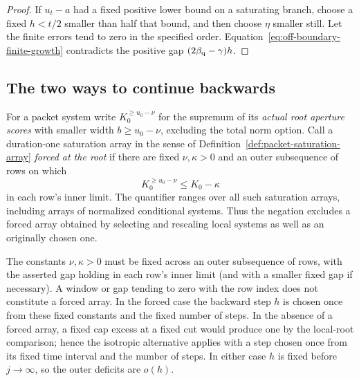\begin{proof}
If \(u_t-a\) had a fixed positive lower bound on a saturating branch,
choose a fixed \(h<t/2\) smaller than half that bound, and then choose
\(\eta\) smaller still.  Let the finite errors tend to zero in the
specified order.  Equation~\eqref{eq:off-boundary-finite-growth}
contradicts the positive gap \((2\beta_{\mathrm q}-\gamma)h\).
\end{proof}



\subsection{The two ways to continue backwards}

For a packet system write $K_0^{\ge u_0-\nu}$ for the supremum of
its \emph{actual root aperture scores} with smaller width
$b\ge u_0-\nu$, excluding the total norm option. Call a duration-one
saturation array in the sense of Definition~\ref{def:packet-saturation-array}
\emph{forced at the root} if there are fixed $\nu,\kappa>0$ and an
outer subsequence of rows on which
\begin{equation}\label{eq:forced-root-gap}
 K_0^{\ge u_0-\nu}\le K_0-\kappa
\end{equation}
in each row's inner limit. The quantifier ranges over all such
saturation arrays, including arrays of normalized conditional
systems. Thus the negation excludes a forced array obtained by
selecting and rescaling local systems as well as an originally chosen
one.

The constants $\nu,\kappa>0$ must be fixed across an outer
subsequence of rows, with the asserted gap holding in each row's
inner limit (and with a smaller fixed gap if necessary).
A window or gap tending to zero with the row index does not constitute
a forced array.  In the forced case the backward step $h$ is chosen
once from these fixed constants and the fixed number of steps.  In
the absence of a forced array, a fixed cap excess at a fixed cut would
produce one by the local-root comparison; hence the isotropic
alternative applies with a step chosen once from its fixed time
interval and the number of steps.  In either case $h$ is fixed before
$j\to\infty$, so the outer deficits are $o(h)$.

